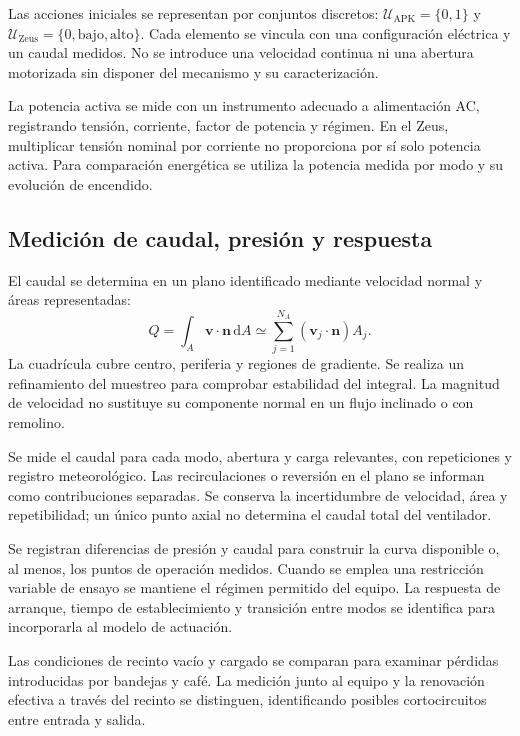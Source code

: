 Las acciones iniciales se representan por conjuntos discretos: $\mathcal U_{\mathrm{APK}}=\{0,1\}$ y $\mathcal U_{\mathrm{Zeus}}=\{0,\mathrm{bajo},\mathrm{alto}\}$. Cada elemento se vincula con una configuración eléctrica y un caudal medidos. No se introduce una velocidad continua ni una abertura motorizada sin disponer del mecanismo y su caracterización.

La potencia activa se mide con un instrumento adecuado a alimentación AC, registrando tensión, corriente, factor de potencia y régimen. En el Zeus, multiplicar tensión nominal por corriente no proporciona por sí solo potencia activa. Para comparación energética se utiliza la potencia medida por modo y su evolución de encendido.

\subsection{Medición de caudal, presión y respuesta}
\label{met:caudal}

El caudal se determina en un plano identificado mediante velocidad normal y áreas representadas:
\begin{equation}
Q=\int_A\mathbf v\cdot\mathbf n\,\mathrm dA
\simeq\sum_{j=1}^{N_A}
(\mathbf v_j\cdot\mathbf n)A_j.
\label{met:caudal_integrado}
\end{equation}
La cuadrícula cubre centro, periferia y regiones de gradiente. Se realiza un refinamiento del muestreo para comprobar estabilidad del integral. La magnitud de velocidad no sustituye su componente normal en un flujo inclinado o con remolino.

Se mide el caudal para cada modo, abertura y carga relevantes, con repeticiones y registro meteorológico. Las recirculaciones o reversión en el plano se informan como contribuciones separadas. Se conserva la incertidumbre de velocidad, área y repetibilidad; un único punto axial no determina el caudal total del ventilador.

Se registran diferencias de presión y caudal para construir la curva disponible o, al menos, los puntos de operación medidos. Cuando se emplea una restricción variable de ensayo se mantiene el régimen permitido del equipo. La respuesta de arranque, tiempo de establecimiento y transición entre modos se identifica para incorporarla al modelo de actuación.

Las condiciones de recinto vacío y cargado se comparan para examinar pérdidas introducidas por bandejas y café. La medición junto al equipo y la renovación efectiva a través del recinto se distinguen, identificando posibles cortocircuitos entre entrada y salida.

